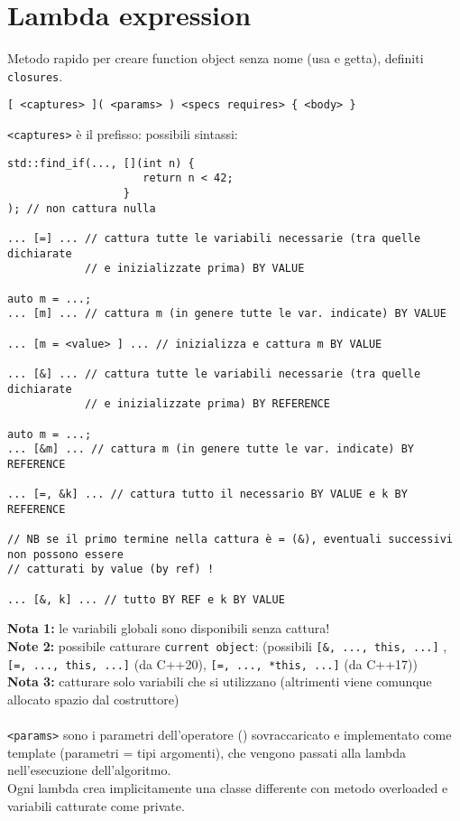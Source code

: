 \documentclass[10pt, oneside]{Book}
\begin{document}
\section{Lambda expression}
Metodo rapido per creare function object senza nome (usa e getta), definiti \texttt{closures}.
\begin{verbatim}
[ <captures> ]( <params> ) <specs requires> { <body> }
\end{verbatim}
\texttt{<captures>} è il prefisso: possibili sintassi:
\begin{verbatim}
std::find_if(..., [](int n) {
                     return n < 42;
                  }
); // non cattura nulla

... [=] ... // cattura tutte le variabili necessarie (tra quelle dichiarate 
            // e inizializzate prima) BY VALUE

auto m = ...;     
... [m] ... // cattura m (in genere tutte le var. indicate) BY VALUE

... [m = <value> ] ... // inizializza e cattura m BY VALUE 

... [&] ... // cattura tutte le variabili necessarie (tra quelle dichiarate 
            // e inizializzate prima) BY REFERENCE
            
auto m = ...;     
... [&m] ... // cattura m (in genere tutte le var. indicate) BY REFERENCE

... [=, &k] ... // cattura tutto il necessario BY VALUE e k BY REFERENCE

// NB se il primo termine nella cattura è = (&), eventuali successivi non possono essere
// catturati by value (by ref) !

... [&, k] ... // tutto BY REF e k BY VALUE
\end{verbatim}
\textbf{Nota 1:} le variabili globali sono disponibili senza cattura!
\\\textbf{Note 2:} possibile catturare \texttt{current object}: (possibili \texttt{[\&, ..., this, ...]} , \texttt{[=, ..., this, ...]} (da C++20), \texttt{[=, ..., *this, ...]} (da C++17))
\\\textbf{Nota 3:} catturare solo variabili che si utilizzano (altrimenti viene comunque allocato spazio dal costruttore)
\\~\\\texttt{<params>} sono i parametri dell'operatore () sovraccaricato e implementato come template (parametri = tipi argomenti), che vengono passati alla lambda nell'esecuzione dell'algoritmo.
\\Ogni lambda crea implicitamente una classe differente con metodo overloaded e variabili catturate come private.
\end{document}
